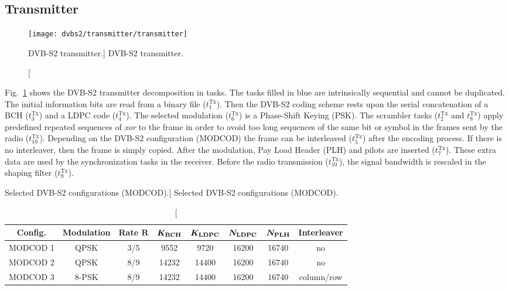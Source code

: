 \subsection{Transmitter}

\begin{figure}[htp]
  \centering
  \texttt{[image: dvbs2/transmitter/transmitter]}
  \caption
    [DVB-S2 transmitter.]
    {DVB-S2 transmitter.}
  \label{fig:dvbs2_transmitter}
\end{figure}

Fig.~\ref{fig:dvbs2_transmitter} shows the DVB-S2 transmitter decomposition in
tasks. The tasks filled in blue are intrinsically sequential and cannot be
duplicated. The initial information bits are read from a binary file
($t^\text{Tx}_1$). Then the DVB-S2 coding scheme rests upon the serial
concatenation of a BCH ($t^\text{Tx}_3$) and a LDPC code ($t^\text{Tx}_4$). The
selected modulation ($t^\text{Tx}_6$) is a Phase-Shift Keying (PSK). The
scrambler tasks ($t^\text{Tx}_2$ and $t^\text{Tx}_8$) apply predefined repeated
sequences of \emph{xor} to the frame in order to avoid too long sequences of the
same bit or symbol in the frames sent by the radio ($t^\text{Tx}_{10}$).
Depending on the DVB-S2 configuration (MODCOD) the frame can be interleaved
($t^\text{Tx}_5$) after the encoding process. If there is no interleaver, then
the frame is simply copied. After the modulation, Pay Load Header (PLH) and
pilots are inserted ($t^\text{Tx}_7$). These extra data are used by the
synchronization tasks in the receiver. Before the radio transmission
($t^\text{Tx}_{10}$), the signal bandwidth is rescaled in the shaping filter
($t^\text{Tx}_9$).

\begin{table}[htp]
  \centering
  \caption
    [Selected DVB-S2 configurations (MODCOD).]
    {Selected DVB-S2 configurations (MODCOD).}
  \label{tab:dvbs2_modcod}
  \begin{tabular}{c c c c c c c c}
    \textbf{Config.} & \textbf{Modulation} & \textbf{Rate} $\bm{R}$ & $\bm{K_\text{\textbf{BCH}}}$ & $\bm{K_\text{\textbf{LDPC}}}$ & $\bm{N_\text{\textbf{LDPC}}}$ & $\bm{N_\text{\textbf{PLH}}}$ & \textbf{Interleaver}\\
    \hline \hline
    MODCOD 1 &  QPSK & 3/5 &  9552 &  9720 & 16200 & 16740 & no\\
    MODCOD 2 &  QPSK & 8/9 & 14232 & 14400 & 16200 & 16740 & no\\
    MODCOD 3 & 8-PSK & 8/9 & 14232 & 14400 & 16200 & 16740 & column/row\\
  \end{tabular}
\end{table}

